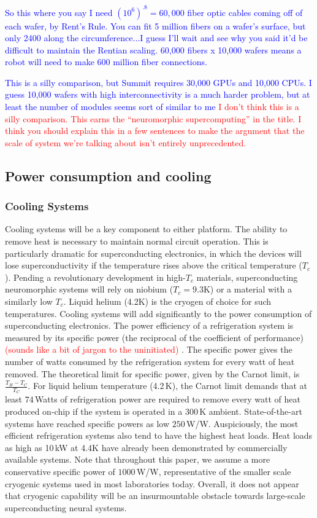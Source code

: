 \documentclass[twocolumn]{article}
\begin{document}
\textcolor{blue}{So this where you say I need $(10^6)^{.8} = 60,000$ fiber optic cables coming off of each wafer, by Rent's Rule. You can fit 5 million fibers on a wafer's surface, but only 2400 along the circumference...I guess I'll wait and see why you said it'd be difficult to maintain the Rentian scaling. 60,000 fibers x 10,000 wafers means a robot will need to make 600 million fiber connections.}


\textcolor{blue}{This is a silly comparison, but Summit requires 30,000 GPUs and 10,000 CPUs. I guess 10,000 wafers with high interconnectivity is a much harder problem, but at least the number of modules seems sort of similar to me}
\textcolor{red}{I don't think this is a silly comparison. This earns the ``neuromorphic supercomputing'' in the title. I think you should explain this in a few sentences to make the argument that the scale of system we're talking about isn't entirely unprecedented.}

\subsection{Power consumption and cooling}

\subsubsection{Cooling Systems}
Cooling systems will be a key component to either platform. The ability to remove heat is necessary to maintain normal circuit operation. This is particularly dramatic for superconducting electronics, in which the devices will lose superconductivity if the temperature rises above the critical temperature ($T_c$). Pending a revolutionary development in high-$T_c$ materials, superconducting neuromorphic systems will rely on niobium ($T_c = 9.3$K) or a material with a similarly low $T_c$. Liquid helium (4.2K) is the cryogen of choice for such temperatures. Cooling systems will add significantly to the power consumption of superconducting electronics. The power efficiency of a refrigeration system is measured by its specific power (the reciprocal of the coefficient of performance) \textcolor{red}{(sounds like a bit of jargon to the uninitiated)} \cite{}. The specific power gives the number of watts consumed by the refrigeration system for every watt of heat removed. The theoretical limit for specific power, given by the Carnot limit, is $\frac{T_H - T_C}{T_C}$. For liquid helium temperature (4.2\,K), the Carnot limit demands that at least $74$\,Watts of refrigeration power are required to remove every watt of heat produced on-chip if the system is operated in a 300\,K ambient. State-of-the-art systems have reached specific powers as low $250$\,W/W. Auspiciously, the most efficient refrigeration systems also tend to have the highest heat loads. Heat loads as high as 10\,kW at 4.4K have already been demonstrated by commercially available systems. Note that throughout this paper, we assume a more conservative specific power of $1000$\,W/W, representative of the smaller scale cryogenic systems used in most laboratories today. Overall, it does not appear that cryogenic capability will be an insurmountable obstacle towards large-scale superconducting neural systems.
\end{document}
